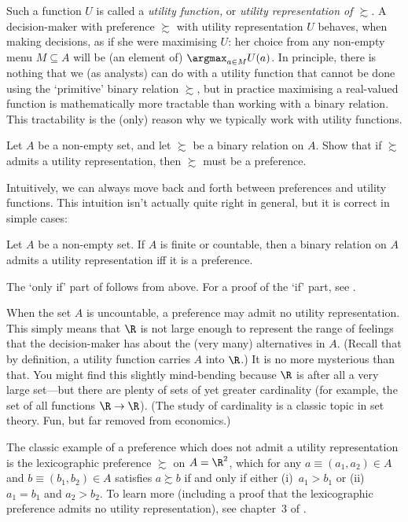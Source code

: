 \documentclass[11pt,letterpaper,reqno,oneside]{book}
\begin{document}
Such a function $U$ is called a \emph{utility function,} or \emph{utility representation of $\succsim$.} A decision-maker with preference $\succsim$ with utility representation $U$ behaves, when making decisions, as if she were maximising $U$: her choice from any non-empty menu $M \subseteq A$ will be (an element of) $\argmax_{a \in M} U(a)$. In principle, there is nothing that we (as analysts) can do with a utility function that cannot be done using the `primitive' binary relation $\succsim$, but in practice maximising a real-valued function is mathematically more tractable than working with a binary relation. This tractability is the (only) reason why we typically work with utility functions.

\begin{exercise}
	\label{exercise:utility}
	Let $A$ be a non-empty set, and let $\succsim$ be a binary relation on $A$. Show that if $\succsim$ admits a utility representation, then $\succsim$ must be a preference.
\end{exercise}

Intuitively, we can always move back and forth between preferences and utility functions. This intuition isn't actually quite right in general, but it is correct in simple cases:

\begin{proposition}
	\label{prop:U_exist_countable}
	Let $A$ be a non-empty set. If $A$ is finite or countable, then a binary relation on $A$ admits a utility representation iff it is a preference.
\end{proposition}

The `only if' part of  follows from  above. For a proof of the `if' part, see \textcite[pp.~23--4]{Kreps1988}.

When the set $A$ is uncountable, a preference may admit no utility representation. This simply means that $\R$ is not large enough to represent the range of feelings that the decision-maker has about the (very many) alternatives in $A$. (Recall that by definition, a utility function carries $A$ into $\R$.) It is no more mysterious than that. You might find this slightly mind-bending because $\R$ is after all a very large set---but there are plenty of sets of yet greater cardinality (for example, the set of all functions $\R \to \R$). (The study of cardinality is a classic topic in set theory. Fun, but far removed from economics.)

The classic example of a preference which does not admit a utility representation is the lexicographic preference $\succsim$ on $A=\R^2$, which for any $a \equiv (a_1,a_2) \in A$ and $b \equiv (b_1,b_2) \in A$ satisfies $a \succsim b$ if and only if either (i)~$a_1 > b_1$ or (ii)~$a_1=b_1$ and $a_2>b_2$. To learn more (including a proof that the lexicographic preference admits no utility representation), see chapter~3 of \textcite{Kreps1988}.
\end{document}
